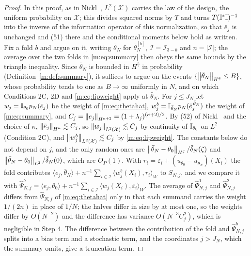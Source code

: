 \begin{proof}
In this proof, as in Nickl~\cite{nicklbvm2024}, $L^2(\mathcal X)$ carries the law of the design, the uniform probability on $\mathcal X$; this divides squared norms by $T$ and turns $T(\mathbb{I}^*\mathbb{I})^{-1}$ into the inverse of the information operator of this normalization, so that $\bar e_j$ is unchanged and (51) there and the conditional moments below hold as written. Fix a fold $b$ and argue on it, writing $\bar\theta_N$ for $\bar\theta^{[b]}_N$, $\mathcal I=\mathcal I_{3-b}$ and $n=|\mathcal I|$; the average over the two folds in \eqref{m:eq:summary} then obeys the same bounds by the triangle inequality. Since $\bar\theta_N$ is bounded in $H^{\bar\gamma}$ in probability (Definition~\ref{m:def:summary}), it suffices to argue on the events $\{\left\|\bar\theta_N\right\|_{H^{\bar\gamma}}\le B\}$, whose probability tends to one as $B\to\infty$ uniformly in $N$, and on which Conditions 2C, 2D and \eqref{m:eq:lipweight} apply at $\bar\theta_N$. For $j\le J_N$ let $w_j=\mathbb{I}_{\theta_0}p_N(\bar e_j)$ be the weight of \eqref{m:eq:thetahat}, $w^b_j=\mathbb{I}_{\bar\theta_N}p_N(\bar e_j^{\,\bar\theta_N})$ the weight of \eqref{m:eq:summary}, and $C_j=\left\|e_j\right\|_{H^{\kappa+2}}=(1+\lambda_j)^{(\kappa+2)/2}$. By (52) of Nickl~\cite{nicklbvm2024} and the choice of $\kappa$, $\left\|\bar e_j\right\|_{H^\kappa}\lesssim C_j$, so $\left\|w_j\right\|_{L^2(\mathcal X)}\lesssim C_j$ by continuity of $\mathbb{I}_{\theta_0}$ on $L^2$ (Condition 2C), and $\left\|w^b_j\right\|_{L^2(\mathcal X)}\lesssim C_j$ by \eqref{m:eq:lipweight}. The constants below do not depend on $j$, and the only random ones are $\left\|\bar\theta_N-\theta_0\right\|_{H^\zeta}/\tilde\delta_N(\zeta)$ and $\left\|\bar\theta_N-\theta_0\right\|_{L^2}/\tilde\delta_N(0)$, which are $O_P(1)$. With $r_i=\varepsilon_i+(u_{\theta_0}-u_{\bar\theta_N})(X_i)$ the fold contributes $\langle e_j,\bar\theta_N\rangle+n^{-1}\sum_{i\in\mathcal I}\langle w^b_j(X_i),r_i\rangle_W$ to $S_{N,j}$, and we compare it with $\hat\Psi^b_{N,j}=\langle e_j,\theta_0\rangle+n^{-1}\sum_{i\in\mathcal I}\langle w_j(X_i),\varepsilon_i\rangle_W$. The average of $\hat\Psi^1_{N,j}$ and $\hat\Psi^2_{N,j}$ differs from $\hat\Psi_{N,j}$ of \eqref{m:eq:thetahat} only in that each summand carries the weight $1/(2n)$ in place of $1/N$; the halves differ in size by at most one, so the weights differ by $O(N^{-2})$ and the difference has variance $O(N^{-3}C_j^2)$, which is negligible in Step 4. The difference between the contribution of the fold and $\hat\Psi^b_{N,j}$ splits into a bias term and a stochastic term, and the coordinates $j>J_N$, which the summary omits, give a truncation term.


\end{proof}
